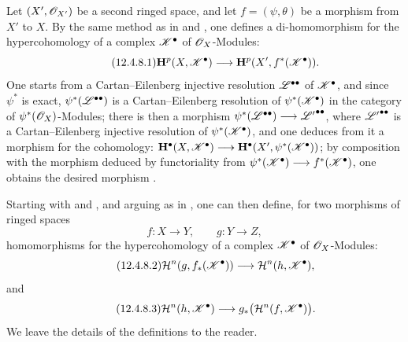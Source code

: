 \begin{env}[12.4.8]
\label{0.12.4.8}
Let $(X',\mathscr{O}_{X'})$ be a second ringed space, and let
$f=(\psi,\theta)$ be a morphism from $X'$ to $X$.
By the same method as in  and , one
defines a di-homomorphism for the hypercohomology of a complex
$\mathscr{K}^\bullet$ of $\mathscr{O}_X$-Modules:
\begin{equation}
\label{0.12.4.8.1}
\tag{12.4.8.1}
  \mathbf{H}^p(X,\mathscr{K}^\bullet)
  \longrightarrow
  \mathbf{H}^p(X',f^*(\mathscr{K}^\bullet)).
\end{equation}
One starts from a Cartan--Eilenberg injective resolution
$\mathscr{L}^{\bullet\bullet}$ of $\mathscr{K}^\bullet$, and since
$\psi^*$ is exact, $\psi^*(\mathscr{L}^{\bullet\bullet})$ is a
Cartan--Eilenberg resolution of $\psi^*(\mathscr{K}^\bullet)$ in the
category of $\psi^*(\mathscr{O}_X)$-Modules;
there is then a morphism $\psi^*(\mathscr{L}^{\bullet\bullet})
\longrightarrow
{\mathscr{L}'}^{\bullet\bullet}$,
where ${\mathscr{L}'}^{\bullet\bullet}$ is a Cartan--Eilenberg injective
resolution of $\psi^*(\mathscr{K}^\bullet)$, and one deduces from it a morphism for the
cohomology: $\mathbf{H}^\bullet(X,\mathscr{K}^\bullet)
\longrightarrow
\mathbf{H}^\bullet
(X',\psi^*(\mathscr{K}^\bullet))$;
by composition with the morphism deduced by functoriality from
$\psi^*(\mathscr{K}^\bullet)\longrightarrow f^*(\mathscr{K}^\bullet)$, one obtains
the desired morphism .

Starting with  and , and arguing as
in , one can then define, for two morphisms of ringed
spaces
\[
  f:X\longrightarrow Y,
  \qquad
  g:Y\longrightarrow Z,
\]
homomorphisms for the hypercohomology of a complex
$\mathscr{K}^\bullet$ of $\mathscr{O}_X$-Modules:
\begin{equation}
\label{0.12.4.8.2}
\tag{12.4.8.2}
  \mathcal{H}^n(g,f_*(\mathscr{K}^\bullet))
  \longrightarrow
  \mathcal{H}^n(h,\mathscr{K}^\bullet),
\end{equation}
and
\begin{equation}
\label{0.12.4.8.3}
\tag{12.4.8.3}
  \mathcal{H}^n(h,\mathscr{K}^\bullet)
  \longrightarrow
  g_*\bigl(\mathcal{H}^n(f,\mathscr{K}^\bullet)\bigr).
\end{equation}
We leave the details of the definitions to the reader.
\end{env}
